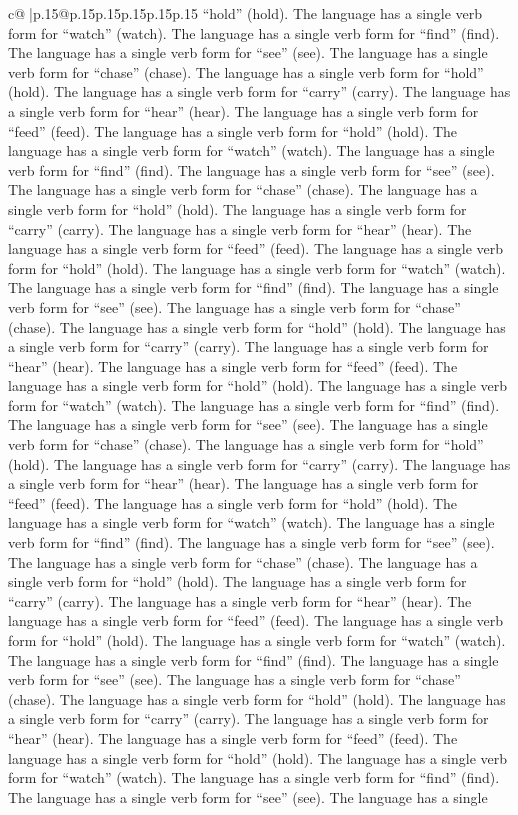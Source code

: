 \documentclass{article}
\begin{document}
{\begin{supertabular}{c@{$\;$}|p{.15\linewidth}@{}p{.15\linewidth}p{.15\linewidth}p{.15\linewidth}p{.15\linewidth}p{.15\linewidth}}
{{{“hold” (hold). The language has a single verb form for “watch” (watch). The language has a single verb form for “find” (find). The language has a single verb form for “see” (see). The language has a single verb form for “chase” (chase). The language has a single verb form for “hold” (hold). The language has a single verb form for “carry” (carry). The language has a single verb form for “hear” (hear). The language has a single verb form for “feed” (feed). The language has a single verb form for “hold” (hold). The language has a single verb form for “watch” (watch). The language has a single verb form for “find” (find). The language has a single verb form for “see” (see). The language has a single verb form for “chase” (chase). The language has a single verb form for “hold” (hold). The language has a single verb form for “carry” (carry). The language has a single verb form for “hear” (hear). The language has a single verb form for “feed” (feed). The language has a single verb form for “hold” (hold). The language has a single verb form for “watch” (watch). The language has a single verb form for “find” (find). The language has a single verb form for “see” (see). The language has a single verb form for “chase” (chase). The language has a single verb form for “hold” (hold). The language has a single verb form for “carry” (carry). The language has a single verb form for “hear” (hear). The language has a single verb form for “feed” (feed). The language has a single verb form for “hold” (hold). The language has a single verb form for “watch” (watch). The language has a single verb form for “find” (find). The language has a single verb form for “see” (see). The language has a single verb form for “chase” (chase). The language has a single verb form for “hold” (hold). The language has a single verb form for “carry” (carry). The language has a single verb form for “hear” (hear). The language has a single verb form for “feed” (feed). The language has a single verb form for “hold” (hold). The language has a single verb form for “watch” (watch). The language has a single verb form for “find” (find). The language has a single verb form for “see” (see). The language has a single verb form for “chase” (chase). The language has a single verb form for “hold” (hold). The language has a single verb form for “carry” (carry). The language has a single verb form for “hear” (hear). The language has a single verb form for “feed” (feed). The language has a single verb form for “hold” (hold). The language has a single verb form for “watch” (watch). The language has a single verb form for “find” (find). The language has a single verb form for “see” (see). The language has a single verb form for “chase” (chase). The language has a single verb form for “hold” (hold). The language has a single verb form for “carry” (carry). The language has a single verb form for “hear” (hear). The language has a single verb form for “feed” (feed). The language has a single verb form for “hold” (hold). The language has a single verb form for “watch” (watch). The language has a single verb form for “find” (find). The language has a single verb form for “see” (see). The language has a single }}}
\end{supertabular}}
\end{document}
